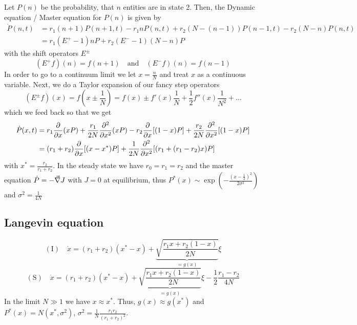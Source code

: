 \documentclass{/home/ben/Templates/notebook}
\begin{document}
	Let $P(n)$ be the probability, that $n$ entities are in state 2. Then, the Dynamic equation / Master equation for $P(n)$ is given by
	\begin{align*}
		\dot{P}(n,t) &= r_1 (n+1) P(n+1, t) - r_1 n P(n,t) + r_2 (N - (n-1)) P(n-1,t) - r_2 (N - n) P(n,t) \\
		&= r_1 (E^+ - 1) n P + r_2 (E^- - 1)(N-n) P
	\end{align*}
	with the shift operators $E^{\pm}$
	\begin{equation*}
		(E^+ f)(n) = f(n+1) \quad \mathrm{and} \quad (E^- f)(n) = f(n-1)
	\end{equation*}
	In order to go to a continuum limit we let $x = \frac{n}{N}$ and treat $x$ as a continuous variable. Next, we do a Taylor expansion of our fancy step operators
	\begin{equation*}
		(E^{\pm} f)(x) = f(x \pm \frac{1}{N}) = f(x) \pm f'(x) \frac{1}{N} + \frac{1}{2} f''(x) \frac{1}{N^2} + \dots
	\end{equation*}
	which we feed back so that we get
	\begin{align*}
		\dot{P}(x,t) &= r_1 \pdv{x}(x P) + \frac{r_1}{2 N} \pdv[2]{x}(x P) - r_2 \pdv{x} [(1-x) P] + \frac{r_2}{2 N} \pdv[2]{x}[(1-x)P] \\
		&= (r_1 + r_2) \pdv{x} [(x-x^*)P] + \frac{1}{2 N} \pdv[2]{x} [(r_1 + (r_1-r_2)x)P]
	\end{align*}
	with $x^* = \frac{r_2}{r_1 + r_2}$. In the steady state we have $r_0 = r_1 = r_2$ and the master equation $\dot{P} = - \vec{\nabla} J$ with $J = 0$ at equilibrium, thus $P^*(x) \sim \exp(- \frac{(x- \frac{1}{2})^2}{2 \sigma^2})$ and $\sigma^2 = \frac{1}{4 N}$
	
	\subsection*{Langevin equation}
	
	\begin{equation}
	\mathrm{(I)} \quad \dot{x} = (r_1 + r_2) (x^* - x) + \underbrace{\sqrt{\frac{r_1 x + r_2 (1-x)}{2 N}}}_{ = g(x)} \xi
	\end{equation}
	\begin{equation}
	\mathrm{(S)} \quad \dot{x} = (r_1 + r_2) (x^* - x) + \underbrace{\sqrt{\frac{r_1 x + r_2 (1-x)}{2 N}}}_{ = g(x)} \xi - \frac{1}{2} \frac{r_1 - r_2}{4 N}
	\end{equation}
	In the limit $N \gg 1$ we have $x \approx x^*$. Thus, $g(x) \approx g(x^*)$ and $P^*(x) = N(x^*, \sigma^2)$, $\sigma^2 = \frac{1}{N} \frac{r_1 r_2}{(r_1 + r_2)^2}$.
	
\end{document}
